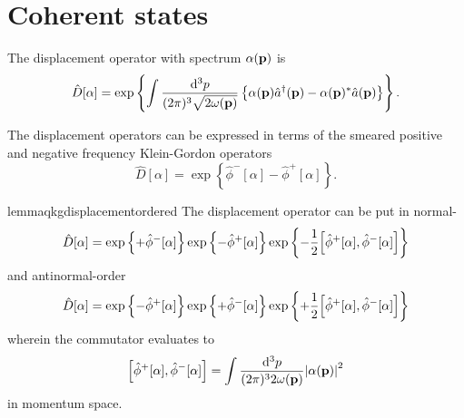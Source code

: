 \section{Coherent states}

\begin{definition}
	The displacement operator with spectrum $\alpha(\vb{p})$ is
	\begin{equation}
		\hat{D}[\alpha]
		=
		\exp\left\{
			\int\frac{\dd[3]{p}}{(2\pi)^3\sqrt{2\omega(\vb{p})}}
			\left\{
				\alpha(\vb{p})
				\hat{a}^\dagger(\vb{p})
				-
				\alpha(\vb{p})^*
				\hat{a}(\vb{p})
			\right\}
		\right\}
		\label{eq:qkg_displacement_operator}
		.
	\end{equation}
\end{definition}
\begin{corollary}\label{thm:qkg_displacement_smeared}
	The displacement operators can be expressed in terms of the smeared positive and negative frequency Klein-Gordon operators
	\begin{equation}
		\hat{D}[\alpha]
		=
		\exp\left\{
			\hat\phi^-[\alpha]
			-
			\hat\phi^+[\alpha]
		\right\}
		.
	\end{equation}
\end{corollary}
\begin{restatable}{lemma}{qkgdisplacementordered}\label{thm:qkg_displacement_ordered}
	The displacement operator can be put in normal-
	\begin{equation}\label{eq:qkg_displacement_normal}
		\hat{D}[\alpha]
		=
		\exp\left\{
			+\hat\phi^-[\alpha]
		\right\}
		\exp\left\{
			-\hat\phi^+[\alpha]
		\right\}
		\exp\left\{
			-
			\frac{1}{2}
			\comm{\hat\phi^+[\alpha]}{\hat\phi^-[\alpha]}
		\right\}
	\end{equation}
	and antinormal-order
	\begin{equation}\label{eq:qkg_displacement_antinormal}
		\hat{D}[\alpha]
		=
		\exp\left\{
			-\hat\phi^+[\alpha]
		\right\}
		\exp\left\{
			+\hat\phi^-[\alpha]
		\right\}
		\exp\left\{
			+
			\frac{1}{2}
			\comm{\hat\phi^+[\alpha]}{\hat\phi^-[\alpha]}
		\right\}
	\end{equation}
	wherein the commutator evaluates to
	\begin{equation}
		\comm{\hat\phi^+[\alpha]}{\hat\phi^-[\alpha]}
		=
		\int\frac{\dd[3]{p}}{(2\pi)^32\omega(\vb{p})}
		\abs{\alpha(\vb{p})}^2
	\end{equation}
	in momentum space.
\end{restatable}

